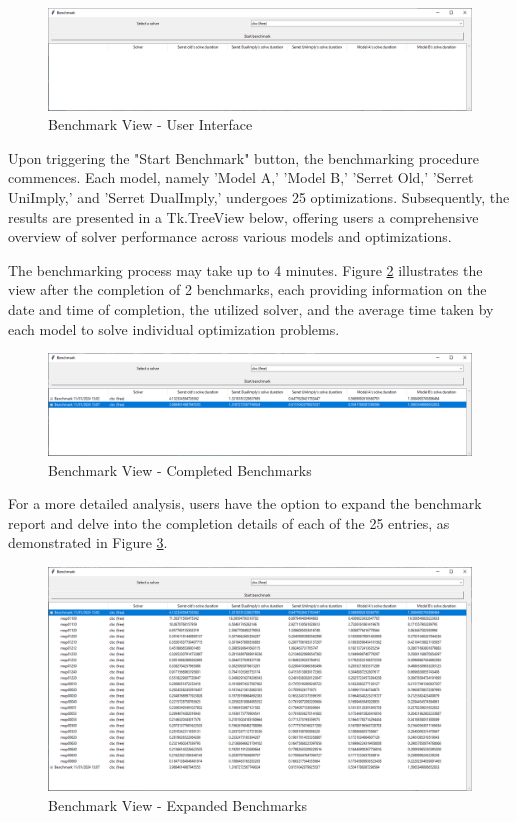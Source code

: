 \begin{figure} [H]
\centering
\includegraphics[width=0.8\linewidth]{Design of the User Interface/benchmark_View.png}
\caption{Benchmark View - User Interface}
\label{fig:benchmark-view}
\end{figure}

Upon triggering the "Start Benchmark" button, the benchmarking procedure commences. Each model, namely 'Model A,' 'Model B,' 'Serret Old,' 'Serret UniImply,' and 'Serret DualImply,' undergoes 25 optimizations. Subsequently, the results are presented in a Tk.TreeView below, offering users a comprehensive overview of solver performance across various models and optimizations.

The benchmarking process may take up to 4 minutes. Figure \ref{fig:benchmark-2-completed} illustrates the view after the completion of 2 benchmarks, each providing information on the date and time of completion, the utilized solver, and the average time taken by each model to solve individual optimization problems.

\begin{figure} [H]
\centering
\includegraphics[width=0.75\linewidth]{Design of the User Interface/benchmark_2_completed.png}
\caption{Benchmark View - Completed Benchmarks}
\label{fig:benchmark-2-completed}
\end{figure}

For a more detailed analysis, users have the option to expand the benchmark report and delve into the completion details of each of the 25 entries, as demonstrated in Figure \ref{fig:expanded_benchmark}.

\begin{figure} [H]
\centering
\includegraphics[width=0.75\linewidth]{benchmark_expanded.png}
\caption{Benchmark View - Expanded Benchmarks}
\label{fig:expanded_benchmark}
\end{figure}